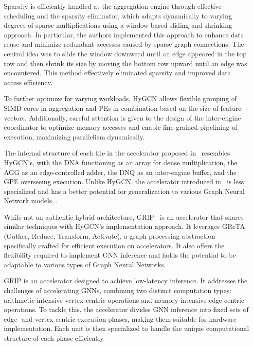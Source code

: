 Sparsity is efficiently handled at the aggregation engine through effective scheduling and the sparsity eliminator, which adapts dynamically to varying degrees of sparse multiplications using a window-based sliding and shrinking approach.
In particular, the authors implemented this approach to enhance data reuse and minimize redundant accesses caused by sparse graph connections.
The central idea was to slide the window downward until an edge appeared in the top row and then shrink its size by moving the bottom row upward until an edge was encountered.
This method effectively eliminated sparsity and improved data access efficiency.

To further optimize for varying workloads, HyGCN allows flexible grouping of SIMD cores in aggregation and PEs in combination based on the size of feature vectors.
Additionally, careful attention is given to the design of the inter-engine coordinator to optimize memory accesses and enable fine-grained pipelining of execution, maximizing parallelism dynamically.

The internal structure of each tile in the accelerator proposed in~\cite{9218751} resembles HyGCN's, with the DNA functioning as an array for dense multiplication, the AGG as an edge-controlled adder, the DNQ as an inter-engine buffer, and the GPE overseeing execution.
Unlike HyGCN, the accelerator introduced in~\cite{9218751} is less specialized and has a better potential for generalization to various Graph Neural Network models~\cite{DBLP:journals/corr/abs-2010-00130}.

While not an authentic hybrid architecture, GRIP~\cite{DBLP:journals/corr/abs-2007-13828} is an accelerator that shares similar techniques with HyGCN's implementation approach.
It leverages GReTA~\cite{greta-recoml20} (Gather, Reduce, Transform, Activate), a graph processing abstraction specifically crafted for efficient execution on accelerators.
It also offers the flexibility required to implement GNN inference and holds the potential to be adaptable to various types of Graph Neural Networks.

GRIP is an accelerator designed to achieve low-latency inference.
It addresses the challenges of accelerating GNNs, combining two distinct computation types: arithmetic-intensive vertex-centric operations and memory-intensive edge-centric operations.
To tackle this, the accelerator divides GNN inference into fixed sets of edge- and vertex-centric execution phases, making them suitable for hardware implementation.
Each unit is then specialized to handle the unique computational structure of each phase efficiently.

